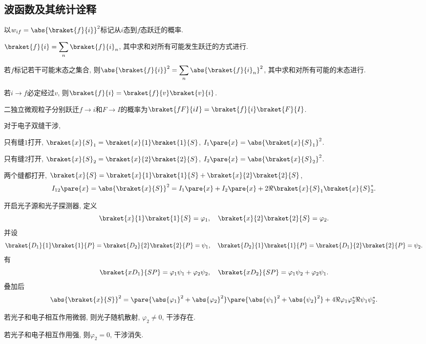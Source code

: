 \documentclass[hidelinks]{ctexart}
\begin{document}

\subsection{波函数及其统计诠释} %
\label{sub:波函数及其统计诠释}

以$w_{if} = \abs{\braket{f}{i}}^2$标记从$i$态到$f$态跃迁的概率.
\begin{cenum}
    \item $\displaystyle \braket{f}{i} = \sum_n \braket{f}{i}_n$, 其中求和对所有可能发生跃迁的方式进行.
    \item 若$f$标记若干可能末态之集合, 则$\displaystyle \abs{\braket{f}{i}}^2 = \sum_n \abs{\braket{f}{i}_n}^2$, 其中求和对所有可能的末态进行.
    \item 若$i\rightarrow f$必定经过$v$, 则$\braket{f}{i} = \braket{f}{v}\braket{v}{i}$.
    \item 二独立微观粒子分别跃迁$f\rightarrow i$和$F\rightarrow I$的概率为$\displaystyle \braket{fF}{iI} = \braket{f}{i} \braket{F}{I}$.
\end{cenum}
对于电子双缝干涉,
\begin{cenum}
    \item 只有缝$1$打开, $\braket{x}{S}_1 = \braket{x}{1}\braket{1}{S}$, $I_1\pare{x} = \abs{\braket{x}{S}_1}^2$.
    \item 只有缝$2$打开, $\braket{x}{S}_2 = \braket{x}{2}\braket{2}{S}$, $I_2\pare{x} = \abs{\braket{x}{S}_2}^2$.
    \item 两个缝都打开, $\braket{x}{S} = \braket{x}{1}\braket{1}{S} + \braket{x}{2}\braket{2}{S}$,
    \[ I_{12}\pare{x} = \abs{\braket{x}{S}}^2 = I_1\pare{x} + I_2\pare{x} + 2 \Re \braket{x}{S}_1 \braket{x}{S}_2^*. \]
    \item 开启光子源和光子探测器, 定义
    \[ \braket{x}{1}\braket{1}{S} = \varphi_1,\quad \braket{x}{2}\braket{2}{S} = \varphi_2. \]
    并设
    \[ \braket{D_1}{1}\braket{1}{P} = \braket{D_2}{2}\braket{2}{P} = \psi_1,\quad \braket{D_2}{1}\braket{1}{P} = \braket{D_1}{2}\braket{2}{P} = \psi_2. \]
    有
    \[ \braket{xD_1}{SP} = \varphi_1\psi_1 + \varphi_2\psi_2,\quad \braket{xD_2}{SP} = \varphi_1\psi_2 + \varphi_2\psi_1. \]
    叠加后
    \[ \abs{\braket{x}{S}}^2 = \pare{\abs{\varphi_1}^2 + \abs{\varphi_2}^2}\pare{\abs{\psi_1}^2 + \abs{\psi_2}^2} + 4\Re\varphi_1\varphi_2^*\Re\psi_1\psi_2^*. \]
    \begin{cenum}
        \item 若光子和电子相互作用微弱, 则光子随机散射, $\varphi_2\neq 0$, 干涉存在.
        \item 若光子和电子相互作用强, 则$\varphi_2 = 0$, 干涉消失.
    \end{cenum}
\end{cenum}
\end{document}
